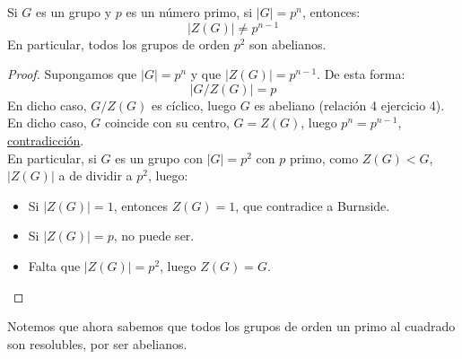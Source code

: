 \begin{coro}
    Si $G$ es un grupo y $p$ es un número primo, si $|G| = p^n$, entonces:
    \begin{equation*}
        |Z(G)| \neq p^{n-1}
    \end{equation*}
    En particular, todos los grupos de orden $p^2$ son abelianos.
    \begin{proof}
        Supongamos que $|G| = p^n$ y que $|Z(G)| = p^{n-1}$. De esta forma:
        \begin{equation*}
            |G/Z(G)| = p
        \end{equation*}
        En dicho caso, $G/Z(G)$ es cíclico, luego $G$ es abeliano (relación 4 ejercicio 4). En dicho caso, $G$ coincide con su centro, $G = Z(G)$, luego $p^n = p^{n-1}$, \underline{contradicción}.\\

        \noindent
        En particular, si $G$ es un grupo con $|G| = p^2$ con $p$ primo, como $Z(G) < G$, $|Z(G)| $ a de dividir a $p^2$, luego:
        \begin{itemize}
            \item Si $|Z(G)| = 1$, entonces $Z(G) = 1$, que contradice a Burnside.
            \item Si $|Z(G)| = p$, no puede ser.
            \item Falta que $|Z(G)| = p^2$, luego $Z(G) = G$.
        \end{itemize}
    \end{proof}
\end{coro}

\begin{observacion}
    Notemos que ahora sabemos que todos los grupos de orden un primo al cuadrado son resolubles, por ser abelianos.
\end{observacion}

